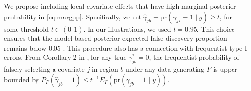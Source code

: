 
We propose including local covariate effects that have high marginal posterior probability in \eqref{eq:margpp}. Specifically, we set $\hat{\gamma}_{jb}=\mbox{pr}(\gamma_{jb}=1 \mid y) \geq t$, for some threshold $t \in (0,1)$. In our illustrations, we used $t=0.95$. This choice ensures that the model-based posterior expected false discovery proportion 
remains below 0.05 \citep{mueller:2004}. 
This procedure also has a connection with frequentist type I errors. From Corollary 2 in \cite{rossell:2022}, for any true $\gamma^*_{jb}=0$, the frequentist probability of falsely selecting a covariate $j$ in region $b$ under any data-generating $F$ is upper bounded by
$ P_F(\hat{\gamma}_{jb}=1) \leq t^{-1} E_F \left( \mbox{pr}(\gamma_{jb} =1 \mid y) \right)$.



